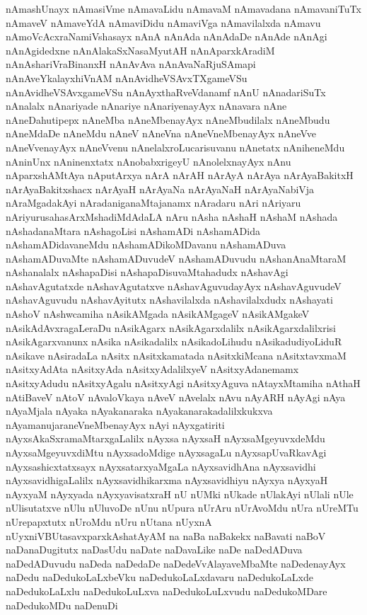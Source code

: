 {nAmashUnayx
nAmasiVme
nAmavaLidu
nAmavaM
nAmavadana
nAmavaniTuTx
nAmaveV
nAmaveYdA
nAmaviDidu
nAmaviVga
nAmavilalxda
nAmavu
nAmoVcAcxraNamiVshasayx
nAnA
nAnAda
nAnAdaDe
nAnAde
nAnAgi
nAnAgidedxne
nAnAlakaSxNasaMyutAH
nAnAparxkAradiM
nAnAshariVraBinanxH
nAnAvAva
nAnAvaNaRjuSAmapi
nAnAveYkalayxhiVnAM
nAnAvidheVSAvxTXgameVSu
nAnAvidheVSAvxgameVSu
nAnAyxthaRveVdanamf
nAnU
nAnadariSuTx
nAnalalx
nAnariyade
nAnariye
nAnariyenayAyx
nAnavara
nAne
nAneDahutipepx
nAneMba
nAneMbenayAyx
nAneMbudilalx
nAneMbudu
nAneMdaDe
nAneMdu
nAneV
nAneVna
nAneVneMbenayAyx
nAneVve
nAneVvenayAyx
nAneVvenu
nAnelalxroLucarisuvanu
nAnetatx
nAniheneMdu
nAninUnx
nAninenxtatx
nAnobabxrigeyU
nAnolelxnayAyx
nAnu
nAparxshAMtAya
nAputArxya
nArA
nArAH
nArAyA
nArAya
nArAyaBakitxH
nArAyaBakitxshacx
nArAyaH
nArAyaNa
nArAyaNaH
nArAyaNabiVja
nAraMgadakAyi
nAradaniganaMtajanamx
nAradaru
nAri
nAriyaru
nAriyurusahasArxMshadiMdAdaLA
nAru
nAsha
nAshaH
nAshaM
nAshada
nAshadanaMtara
nAshagoLisi
nAshamADi
nAshamADida
nAshamADidavaneMdu
nAshamADikoMDavanu
nAshamADuva
nAshamADuvaMte
nAshamADuvudeV
nAshamADuvudu
nAshanAnaMtaraM
nAshanalalx
nAshapaDisi
nAshapaDisuvaMtahadudx
nAshavAgi
nAshavAgutatxde
nAshavAgutatxve
nAshavAguvudayAyx
nAshavAguvudeV
nAshavAguvudu
nAshavAyitutx
nAshavilalxda
nAshavilalxdudx
nAshayati
nAshoV
nAshwcamiha
nAsikAMgada
nAsikAMgageV
nAsikAMgakeV
nAsikAdAvxragaLeraDu
nAsikAgarx
nAsikAgarxdalilx
nAsikAgarxdalilxrisi
nAsikAgarxvanunx
nAsika
nAsikadalilx
nAsikadoLihudu
nAsikadudiyoLiduR
nAsikave
nAsiradaLa
nAsitx
nAsitxkamatada
nAsitxkiMcana
nAsitxtavxmaM
nAsitxyAdAta
nAsitxyAda
nAsitxyAdalilxyeV
nAsitxyAdanemamx
nAsitxyAdudu
nAsitxyAgalu
nAsitxyAgi
nAsitxyAguva
nAtayxMtamiha
nAthaH
nAtiBaveV
nAtoV
nAvaloVkaya
nAveV
nAvelalx
nAvu
nAyARH
nAyAgi
nAya
nAyaMjala
nAyaka
nAyakanaraka
nAyakanarakadalilxkukxva
nAyamanujaraneVneMbenayAyx
nAyi
nAyxgatiriti
nAyxsAkaSxramaMtarxgaLalilx
nAyxsa
nAyxsaH
nAyxsaMgeyuvxdeMdu
nAyxsaMgeyuvxdiMtu
nAyxsadoMdige
nAyxsagaLu
nAyxsapUvaRkavAgi
nAyxsashicxtatxsayx
nAyxsatarxyaMgaLa
nAyxsavidhAna
nAyxsavidhi
nAyxsavidhigaLalilx
nAyxsavidhikarxma
nAyxsavidhiyu
nAyxya
nAyxyaH
nAyxyaM
nAyxyada
nAyxyavisatxraH
nU
nUMki
nUkade
nUlakAyi
nUlali
nUle
nUlisutatxve
nUlu
nUluvoDe
nUnu
nUpura
nUrAru
nUrAvoMdu
nUra
nUreMTu
nUrepapxtutx
nUroMdu
nUru
nUtana
nUyxnA
nUyxniVBUtasavxparxkAshatAyAM
na
naBa
naBakekx
naBavati
naBoV
naDanaDugitutx
naDasUdu
naDate
naDavaLike
naDe
naDedADuva
naDedADuvudu
naDeda
naDedaDe
naDedeVvAlayaveMbaMte
naDedenayAyx
naDedu
naDedukoLaLxbeVku
naDedukoLaLxdavaru
naDedukoLaLxde
naDedukoLaLxlu
naDedukoLuLxva
naDedukoLuLxvudu
naDedukoMDare
naDedukoMDu
naDenuDi
}
